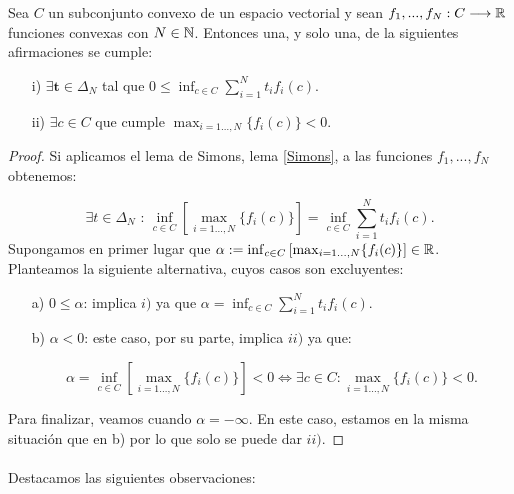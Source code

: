 	\begin{teoremaBox}\label{Gordan}
		Sea $ C $ un subconjunto convexo de un espacio vectorial y sean $ f_1,...,f_N : C \longrightarrow \mathbb{R} $ funciones convexas con $ N \in \mathbb{N} $. Entonces una, y solo una, de la siguientes afirmaciones se cumple:
		\begin{itemize}
			\item[i)] $ \exists \mathbf{t} \in \Delta_N $ tal que $ 0 \leq \inf_{c\in C}  \sum_{i=1}^{N}{t_i f_i (c)}$.
			\item[ii)] $ \exists c \in C $ que cumple $\max_{i=1\dots,N } \{f_i(c)\} < 0 $.
		\end{itemize}
	\end{teoremaBox}
	\begin{proof}
		Si aplicamos el lema de Simons, lema \ref{Simons}, a las funciones $ f_1,...,f_N $ obtenemos:
		
		\begin{equation*}
			\exists t \in \Delta_N \text{ : } \inf_{ c\in C}\left[\max_{i=1\dots,N } \{f_i(c)\} \right] = \inf_{c \in C} \sum_{i=1}^{N}t_i f_i (c).
		\end{equation*}
		Supongamos en primer lugar que $ \alpha := \inf_{ c\in C}\left[\max_{i=1\dots,N } \{f_i(c)\} \right] \in \mathbb{R} $. Planteamos la siguiente alternativa, cuyos casos son excluyentes:
		\begin{itemize}
			\item[a)] $ 0 \leq \alpha $: implica $ i) $ ya que $ \alpha = \inf_{c \in C} \sum_{i=1}^{N}t_i f_i (c) $.
			\item[b)] $ \alpha < 0 $: este caso, por su parte, implica $ ii) $ ya que:
			
			\begin{equation*}
				\alpha =\inf_{ c\in C}\left[\max_{i=1\dots,N } \{f_i(c)\} \right] < 0 \Longleftrightarrow \exists c \in C  :\max_{i=1\dots,N } \{f_i(c)\} < 0. 
			\end{equation*}  
		\end{itemize}
		Para finalizar, veamos cuando $ \alpha =-\infty $. En este caso, estamos en la misma situación que en b) por lo que solo se puede dar $ ii) $.
	\end{proof}

	\paragraph{} Destacamos las siguientes observaciones:
	
